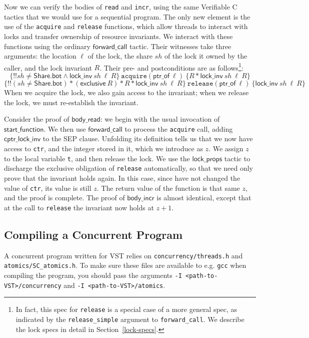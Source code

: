 \documentclass[11pt]{article}
\begin{document}
Now we can verify the bodies of \texttt{read} and \texttt{incr}, using the same Verifiable C tactics that we would use for a sequential program. The only new element is the use of the \texttt{acquire} and \texttt{release} functions, which allow threads to interact with locks and transfer ownership of resource invariants. We interact with these functions using the ordinary $\mathsf{forward\_call}$ tactic. Their witnesses take three arguments: the location $\ell$ of the lock, the share $\mathit{sh}$ of the lock it owned by the caller, and the lock invariant $R$. Their pre- and postconditions are as follows\footnote{In fact, this spec for \texttt{release} is a special case of a more general spec, as indicated by the \texttt{release\_simple} argument to \texttt{forward\_call}. We describe the lock specs in detail in Section~\ref{lock-specs}.}:
$$\{!!\mathit{sh} \neq \mathsf{Share.bot} \land \mathsf{lock\_inv}\ \mathit{sh}\ \ell\ R\}\ \texttt{acquire}(\mathsf{ptr\_of}\ \ell)\ \{R * \mathsf{lock\_inv}\ \mathit{sh}\ \ell\ R\}$$
$$\{!!(\mathit{sh} \neq \mathsf{Share.bot}) * (\mathsf{exclusive}\ R) * R * \mathsf{lock\_inv}\ \mathit{sh}\ \ell\ R\}\ \texttt{release}(\mathsf{ptr\_of}\ \ell)\ \{\mathsf{lock\_inv}\ \mathit{sh}\ \ell\ R\}$$
When we acquire the lock, we also gain access to the invariant; when we release the lock, we must re-establish the invariant.

Consider the proof of $\mathsf{body\_read}$: we begin with the usual invocation of $\mathsf{start\_function}$. We then use $\mathsf{forward\_call}$ to process the \texttt{acquire} call, adding $\mathsf{cptr\_lock\_inv}$ to the \textsf{SEP} clause. Unfolding its definition tells us that we now have access to \texttt{ctr}, and the integer stored in it, which we introduce as $z$. We assign $z$ to the local variable \texttt{t}, and then release the lock. We use the $\mathsf{lock\_props}$ tactic to discharge the exclusive obligation of \texttt{release} automatically, so that we need only prove that the invariant holds again. In this case, since have not changed the value of \texttt{ctr}, its value is still $z$. The return value of the function is that same $z$, and the proof is complete. The proof of $\mathsf{body\_incr}$ is almost identical, except that at the call to \texttt{release} the invariant now holds at $z + 1$.

\subsection{Compiling a Concurrent Program}
A concurrent program written for VST relies on \texttt{concurrency/threads.h} and \texttt{atomics/SC\_atomics.h}. To make sure these files are available to e.g. \texttt{gcc} when compiling the program, you should pass the arguments \texttt{-I <path-to-VST>/concurrency} and \texttt{-I <path-to-VST>/atomics}.
\end{document}
